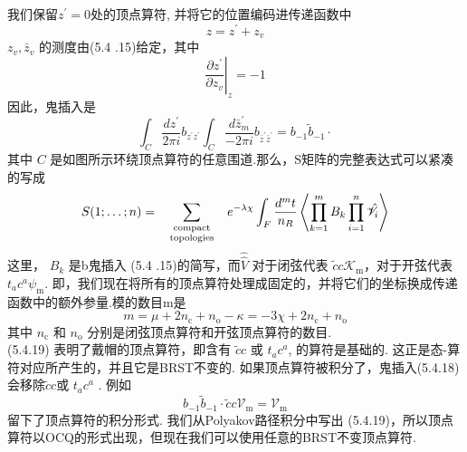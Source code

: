 我们保留$z^{\prime}=0$处的顶点算符, 并将它的位置编码进传递函数中
\begin{equation}
	z=z^{\prime}+z_{v}
\end{equation}
 $z_{v}, \bar{z}_{v}$ 的测度由(5.4 .15)给定，其中
\begin{equation}
	\left.\frac{\partial z^{\prime}}{\partial z_{v}}\right|_{z}=-1
\end{equation}
因此，鬼插入是
\begin{equation}
	\int_{C} \frac{d z^{\prime}}{2 \pi i} b_{z^{\prime} z^{\prime}} \int_{C} \frac{d \bar{z}_{m}^{\prime}}{-2 \pi i} b_{\bar{z}^{\prime} \bar{z}^{\prime}}=b_{-1} \tilde{b}_{-1} \cdot
\end{equation}
其中 $C$ 是如图所示环绕顶点算符的任意围道.那么，S矩阵的完整表达式可以紧凑的写成
\begin{equation}
	S(1 ; \ldots ; n)=\sum_{\begin{array}{c}
			\text { compact } \atop \text { topologies }
	\end{array}} e^{-\lambda \chi} \int_{F} \frac{d^{m} t}{n_{R}}\left\langle\prod_{k=1}^{m} B_{k} \prod_{i=1}^{n} \hat{\mathscr{V}}_{i}\right\rangle
\end{equation}
这里， $B_{k}$ 是b鬼插入 (5.4 .15)的简写，而$\hat{\hat{V}}$ 对于闭弦代表 $\tilde{c} c \mathscr{K}_{\mathrm{m}}$，对于开弦代表 $t_{a} c^{a} \mathscr{\psi}_{\mathrm{m}}$. 即，我们现在将所有的顶点算符处理成固定的，并将它们的坐标换成传递函数中的额外参量.模的数目m是
\begin{equation}
	m=\mu+2 n_{\mathrm{c}}+n_{\mathrm{o}}-\kappa=-3 \chi+2 n_{\mathrm{c}}+n_{\mathrm{o}}
\end{equation}
其中 $n_{\mathrm{c}}$ 和 $n_{\mathrm{o}}$ 分别是闭弦顶点算符和开弦顶点算符的数目.\\
(5.4.19) 表明了戴帽的顶点算符，即含有 $\tilde{c} c$ 或 $t_{a} c^{a}$, 的算符是基础的. 这正是态-算符对应所产生的，并且它是BRST不变的. 如果顶点算符被积分了，鬼插入(5.4.18) 会移除$\tilde{c} c$或 $t_{a} c^{a} $ . 例如
\begin{equation}
	b_{-1} \tilde{b}_{-1} \cdot \tilde{c} c \mathscr{V}_{\mathrm{m}}=\mathscr{V}_{\mathrm{m}}
\end{equation}
留下了顶点算符的积分形式. 我们从Polyakov路径积分中写出 (5.4.19)，所以顶点算符以OCQ的形式出现，但现在我们可以使用任意的BRST不变顶点算符.

